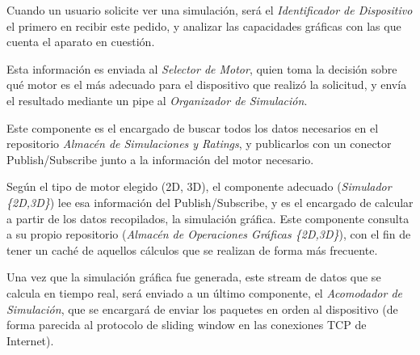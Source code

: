 Cuando un usuario solicite ver una simulación, será el \emph{Identificador de Dispositivo} el primero en recibir este pedido, y analizar las capacidades gráficas con las que cuenta el aparato en cuestión.

Esta información es enviada al \emph{Selector de Motor}, quien toma la decisión sobre qué motor es el más adecuado para el dispositivo que realizó la solicitud, y envía el resultado mediante un pipe al \emph{Organizador de Simulación}.

Este componente es el encargado de buscar todos los datos necesarios en el repositorio \emph{Almacén de Simulaciones y Ratings}, y publicarlos con un conector Publish/Subscribe junto a la información del motor necesario.

Según el tipo de motor elegido (2D, 3D), el componente adecuado (\emph{Simulador \{2D,3D\}}) lee esa información del Publish/Subscribe, y es el encargado de calcular a partir de los datos recopilados, la simulación gráfica. Este componente consulta a su propio repositorio (\emph{Almacén de Operaciones Gráficas \{2D,3D\}}), con el fin de tener un caché de aquellos cálculos que se realizan de forma más frecuente.

Una vez que la simulación gráfica fue generada, este stream de datos que se calcula en tiempo real, será enviado a un último componente, el \emph{Acomodador de Simulación}, que se encargará de enviar los paquetes en orden al dispositivo (de forma parecida al protocolo de sliding window en las conexiones TCP de Internet).